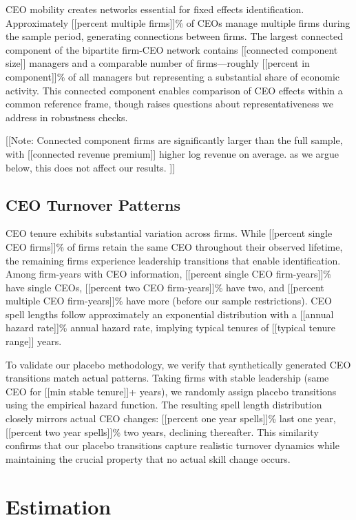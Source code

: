 \documentclass[11pt,a4paper]{article}
\begin{document}
CEO mobility creates networks essential for fixed effects identification. Approximately [[percent multiple firms]]\% of CEOs manage multiple firms during the sample period, generating connections between firms. The largest connected component of the bipartite firm-CEO network contains [[connected component size]] managers and a comparable number of firms—roughly [[percent in component]]\% of all managers but representing a substantial share of economic activity. This connected component enables comparison of CEO effects within a common reference frame, though raises questions about representativeness we address in robustness checks.

[[Note: Connected component firms are significantly larger than the full sample, with [[connected revenue premium]] higher log revenue on average. as we argue below, this does not affect our results. ]]

\subsection{CEO Turnover Patterns}

CEO tenure exhibits substantial variation across firms. While [[percent single CEO firms]]\% of firms retain the same CEO throughout their observed lifetime, the remaining firms experience leadership transitions that enable identification. Among firm-years with CEO information, [[percent single CEO firm-years]]\% have single CEOs, [[percent two CEO firm-years]]\% have two, and [[percent multiple CEO firm-years]]\% have more (before our sample restrictions). CEO spell lengths follow approximately an exponential distribution with a [[annual hazard rate]]\% annual hazard rate, implying typical tenures of [[typical tenure range]] years.

To validate our placebo methodology, we verify that synthetically generated CEO transitions match actual patterns. Taking firms with stable leadership (same CEO for [[min stable tenure]]+ years), we randomly assign placebo transitions using the empirical hazard function. The resulting spell length distribution closely mirrors actual CEO changes: [[percent one year spells]]\% last one year, [[percent two year spells]]\% two years, declining thereafter. This similarity confirms that our placebo transitions capture realistic turnover dynamics while maintaining the crucial property that no actual skill change occurs.

\section{Estimation}
\end{document}

